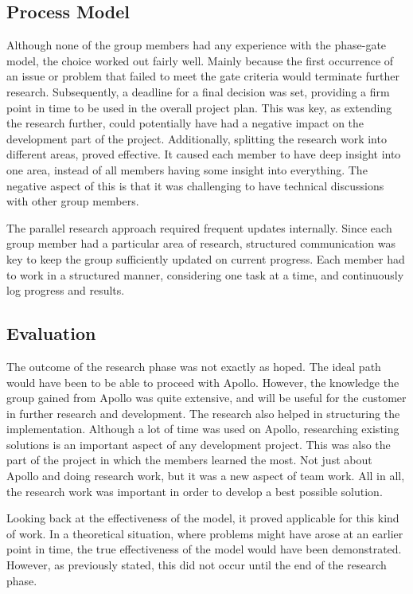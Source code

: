 \subsection{Process Model}
\label{subsec:project_evaluation-research_phase-process_model}

Although none of the group members had any experience with the phase-gate model, the choice worked out fairly well. Mainly because the first occurrence of an issue or problem that failed to meet the gate criteria would terminate further research. Subsequently, a deadline for a final decision was set, providing a firm point in time to be used in the overall project plan. This was key, as extending the research further, could potentially have had a negative impact on the development part of the project. Additionally, splitting the research work into different areas, proved effective. It caused each member to have deep insight into one area, instead of all members having some insight into everything. The negative aspect of this is that it was challenging to have technical discussions with other group members.

The parallel research approach required frequent updates internally. Since each group member had a particular area of research, structured communication was key to keep the group sufficiently updated on current progress. Each member had to work in a structured manner, considering one task at a time, and continuously log progress and results.

\subsection{Evaluation}
\label{subsec:project_evaluation-research_phase-evaluation}

The outcome of the research phase was not exactly as hoped. The ideal path would have been to be able to proceed with Apollo. However, the knowledge the group gained from Apollo was quite extensive, and will be useful for the customer in further research and development. The research also helped in structuring the implementation. Although a lot of time was used on Apollo, researching existing solutions is an important aspect of any development project. This was also the part of the project in which the members learned the most. Not just about Apollo and doing research work, but it was a new aspect of team work. All in all, the research work was important in order to develop a best possible solution.

Looking back at the effectiveness of the model, it proved applicable for this kind of work. In a theoretical situation, where problems might have arose at an earlier point in time, the true effectiveness of the model would have been demonstrated. However, as previously stated, this did not occur until the end of the research phase.

